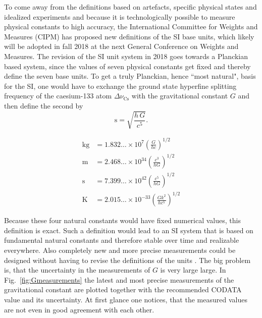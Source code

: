 \documentclass[prb,preprint]{revtex4-1}
\begin{document}
To come away from the definitions based on artefacts, specific physical states and idealized experiments and because it is technologically possible to measure physical constants to high accuracy, the International Committee for Weights and Measures (CIPM) has proposed new definitions of the SI base units, which likely will be adopted in fall 2018 at the next General Conference on Weights and Measures. The revision of the SI unit system in 2018 goes towards a Planckian based system, since the values of seven physical constants get fixed and thereby define the seven base units. 
To get a truly Planckian, hence ``most natural", basis for the SI, one would have to exchange the ground state hyperfine splitting frequency of the caesium-133 atom $\Delta \nu_{\mathrm{Cs}}$ with the gravitational constant $G$ and then define the second by  
\begin{equation}
\mathrm{s} = \sqrt{\frac{h \, G}{c^5}}.
\end{equation}

\begin{equation}
\begin{aligned}
\mathrm{kg} &= 1.832\ldots \times 10^7
               \left(\frac{G}{hc}\right)^{\!1/2} \\
\mathrm{m}  &= 2.468\ldots \times 10^{34}
               \left(\frac{c^3}{hG}\right)^{\!1/2} \\
\mathrm{s}  &= 7.399\ldots \times 10^{42}
               \left(\frac{c^5}{hG}\right)^{\!1/2} \\
\mathrm{K}  &= 2.015\ldots \times 10^{-33}
               \left(\frac{Gk^2}{hc^5}\right)^{\!1/2}
\end{aligned}
\end{equation}


Because these four natural constants would have fixed numerical values, this definition is exact. Such a definition would lead to an SI system that is based on fundamental natural constants and therefore stable over time and realizable everywhere. Also completely new and more precise measurements could be designed without having to revise the definitions of the units \cite{Fischer16}. The big problem is, that the uncertainty in the measurements of $G$ is very large large. In Fig.~\ref{fig:Gmeasurements} the latest and most precise measurements of the gravitational constant are plotted together with the recommended CODATA value and its uncertainty. At first glance one notices, that the measured values are not even in good agreement with each other.\\
\end{document}
